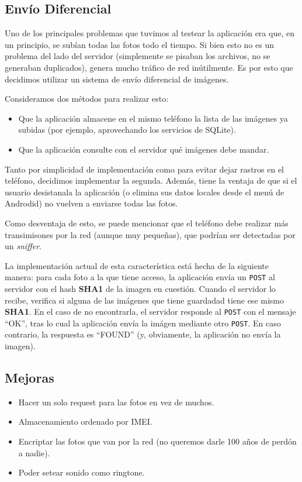 \documentclass[10pt, a4paper,english,spanish]{article}
\renewcommand{\emph}[1]{\textit{#1}}
\begin{document}

\subsection{Envío Diferencial} %
\label{ssub:Envío Diferencial}
Uno de los principales problemas que tuvimos al testear la aplicación era que, en un principio, se subían todas las fotos todo el tiempo. Si bien esto no es un problema del lado del servidor (simplemente se pisaban los archivos, no se generaban duplicados), genera mucho tráfico de red inútilmente. Es por esto que decidimos utilizar un sistema de envío diferencial de imágenes. 

Consideramos dos métodos para realizar esto:
\begin{itemize}
	\item Que la aplicación almacene en el mismo teléfono la lista de las imágenes ya subidas (por ejemplo, aprovechando los servicios de SQLite).
	\item Que la aplicación consulte con el servidor qué imágenes debe mandar. 
\end{itemize}

Tanto por simplicidad de implementación como para evitar dejar rastros en el teléfono, decidimos implementar la segunda. Además, tiene la ventaja de que si el usuario desistanala la aplicación (o elimina sus datos locales desde el menú de Androdid) no vuelven a enviarse todas las fotos. 

Como desventaja de esto, se puede mencionar que el teléfono debe realizar más transimisones por la red (aunque muy pequeñas), que podrían ser detectadas por un \emph{sniffer}.


La implementación actual de esta característica está hecha de la siguiente manera: para cada foto a la que tiene acceso, la aplicación envía un \texttt{POST} al servidor con el hash \textbf{SHA1} de la imagen en cuestión. Cuando el servidor lo recibe, verifica si alguna de las imágenes que tiene guardadad tiene ese mismo \textbf{SHA1}. En el caso de no encontrarla, el servidor responde al \texttt{POST} con el mensaje ``OK'', tras lo cual la aplicación envía la imágen mediante otro \texttt{POST}.
En caso contrario, la respuesta es ``FOUND'' (y, obviamente, la aplicación no envía la imagen).

\subsection{Mejoras} %
\label{ssub:Mejoras}
\begin{itemize}
	\item Hacer un solo request para las fotos en vez de muchos.
	\item Almacenamiento ordenado por IMEI.
	\item Encriptar las fotos que van por la red (no queremos darle 100 años de perdón a nadie).
	\item Poder setear sonido como ringtone.
\end{itemize}
\end{document}
